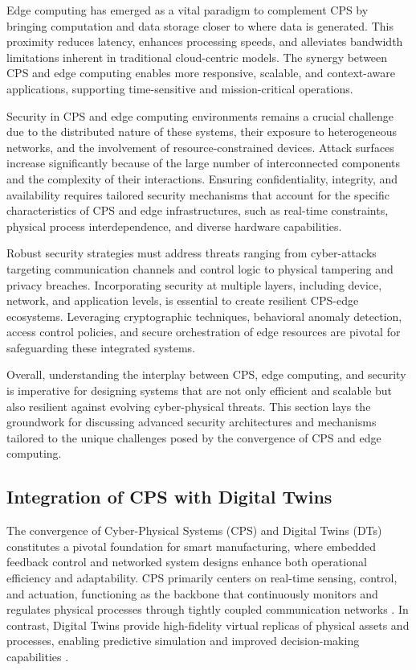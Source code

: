 \documentclass[sigconf]{acmart}
\begin{document}
Edge computing has emerged as a vital paradigm to complement CPS by bringing computation and data storage closer to where data is generated. This proximity reduces latency, enhances processing speeds, and alleviates bandwidth limitations inherent in traditional cloud-centric models. The synergy between CPS and edge computing enables more responsive, scalable, and context-aware applications, supporting time-sensitive and mission-critical operations.

Security in CPS and edge computing environments remains a crucial challenge due to the distributed nature of these systems, their exposure to heterogeneous networks, and the involvement of resource-constrained devices. Attack surfaces increase significantly because of the large number of interconnected components and the complexity of their interactions. Ensuring confidentiality, integrity, and availability requires tailored security mechanisms that account for the specific characteristics of CPS and edge infrastructures, such as real-time constraints, physical process interdependence, and diverse hardware capabilities.

Robust security strategies must address threats ranging from cyber-attacks targeting communication channels and control logic to physical tampering and privacy breaches. Incorporating security at multiple layers, including device, network, and application levels, is essential to create resilient CPS-edge ecosystems. Leveraging cryptographic techniques, behavioral anomaly detection, access control policies, and secure orchestration of edge resources are pivotal for safeguarding these integrated systems.

Overall, understanding the interplay between CPS, edge computing, and security is imperative for designing systems that are not only efficient and scalable but also resilient against evolving cyber-physical threats. This section lays the groundwork for discussing advanced security architectures and mechanisms tailored to the unique challenges posed by the convergence of CPS and edge computing.

\subsection{Integration of CPS with Digital Twins}

The convergence of Cyber-Physical Systems (CPS) and Digital Twins (DTs) constitutes a pivotal foundation for smart manufacturing, where embedded feedback control and networked system designs enhance both operational efficiency and adaptability. CPS primarily centers on real-time sensing, control, and actuation, functioning as the backbone that continuously monitors and regulates physical processes through tightly coupled communication networks \cite{ref9}. In contrast, Digital Twins provide high-fidelity virtual replicas of physical assets and processes, enabling predictive simulation and improved decision-making capabilities \cite{ref12}.
\end{document}
